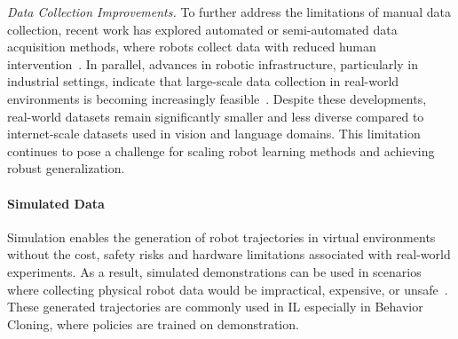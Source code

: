 	\textit{Data Collection Improvements.} To further address the limitations of manual data collection, recent work has explored automated or semi-automated data acquisition methods, where robots collect data with reduced human intervention~\cite{Bousmalis2023RoboCatAS, Ahn2024AutoRTEF, Yang2023RobotFM}. In parallel, advances in robotic infrastructure, particularly in industrial settings, indicate that large-scale data collection in real-world environments is becoming increasingly feasible~\cite{McCarthy_2025}.
	Despite these developments, real-world datasets remain significantly smaller and less diverse compared to internet-scale datasets used in vision and language domains. This limitation continues to pose a challenge for scaling robot learning methods and achieving robust generalization.


\paragraph{Simulated Data}
	
	Simulation enables the generation of robot trajectories in virtual environments without the cost, safety risks and hardware limitations associated with real-world experiments. As a result, simulated demonstrations can be used in scenarios where collecting physical robot data would be impractical, expensive, or unsafe~\cite{Kaufmann2023ChampionlevelDR, Zhang2022FineGrainedEH, Nasiriany2024RoboCasaLS}.
	These generated trajectories are commonly used in \ac{IL} especially in Behavior Cloning, where policies are trained on demonstration.


